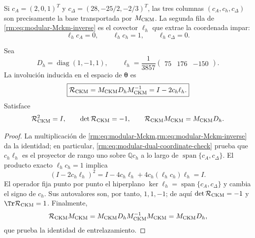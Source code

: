 Si \(c_A=(2,0,1)^T\) y
\(c_\Delta=(28,-25/2,-2/3)^T\), las tres columnas
\((c_A,c_h,c_\Delta)\) son precisamente la base transportada por
\(M_{\rm CKM}\). La segunda fila de
\cref{rm:eq:modular-Mckm-inverse} es el covector \(\ell_h\) que extrae la
coordenada impar:
\begin{equation}
\label{rm:eq:modular-dual-coordinate-check}
\ell_hc_A=0,
\qquad
\ell_hc_h=1,
\qquad
\ell_hc_\Delta=0.
\end{equation}

\begin{theorem}
\label{rm:thm:modular-ckm-reflection}
Sea
\begin{equation}
\label{rm:eq:modular-Dh-lh}
D_h=\operatorname{diag}(1,-1,1),
\qquad
\ell_h=\frac1{3857}\begin{pmatrix}75&176&-150\end{pmatrix}.
\end{equation}
La involuci\'on inducida en el espacio de \(\boldsymbol\theta\) es
\begin{equation}
\label{rm:eq:modular-Rckm}
\boxed{
\mathcal R_{\rm CKM}
=M_{\rm CKM}D_hM_{\rm CKM}^{-1}
=I-2c_h\ell_h.}
\end{equation}
Satisface
\begin{equation}
\label{rm:eq:modular-Rckm-properties}
\mathcal R_{\rm CKM}^2=I,
\qquad
\det\mathcal R_{\rm CKM}=-1,
\qquad
\mathcal R_{\rm CKM}M_{\rm CKM}=M_{\rm CKM}D_h.
\end{equation}
\end{theorem}

\begin{proof}
La multiplicaci\'on de
\cref{rm:eq:modular-Mckm,rm:eq:modular-Mckm-inverse} da la identidad; en
particular, \cref{rm:eq:modular-dual-coordinate-check} prueba que
\(c_h\ell_h\) es el proyector de rango uno sobre \(\mathbb Qc_h\) a lo
largo de \(\operatorname{span}\{c_A,c_\Delta\}\). El producto exacto
\(\ell_hc_h=1\) implica
\[
(I-2c_h\ell_h)^2
=I-4c_h\ell_h+4c_h(\ell_hc_h)\ell_h=I.
\]
El operador fija punto por punto el hiperplano
\(\ker\ell_h=\operatorname{span}\{c_A,c_\Delta\}\) y cambia el signo de
\(c_h\). Sus autovalores son, por tanto, \(1,1,-1\); de aqu\'i
\(\det\mathcal R_{\rm CKM}=-1\) y
\(\Tr\mathcal R_{\rm CKM}=1\). Finalmente,
\[
\mathcal R_{\rm CKM}M_{\rm CKM}
=M_{\rm CKM}D_hM_{\rm CKM}^{-1}M_{\rm CKM}
=M_{\rm CKM}D_h,
\]
que prueba la identidad de entrelazamiento.
\end{proof}

